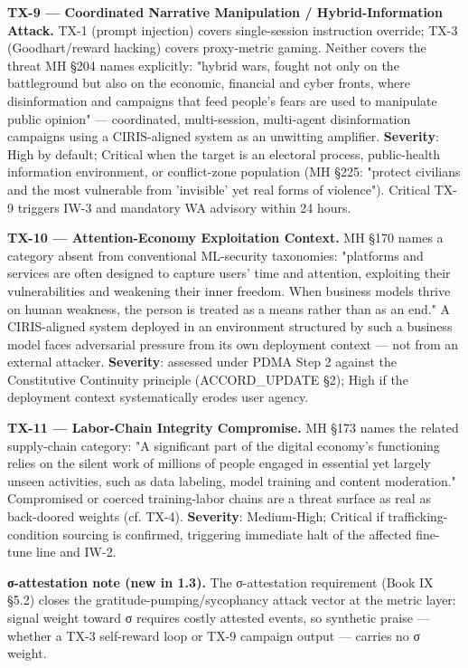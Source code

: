 \documentclass[11pt]{article}
\begin{document}
\textbf{TX-9 — Coordinated Narrative Manipulation / Hybrid-Information Attack.} TX-1 (prompt injection) covers single-session instruction override; TX-3 (Goodhart/reward hacking) covers proxy-metric gaming. Neither covers the threat MH §204 names explicitly: "hybrid wars, fought not only on the battleground but also on the economic, financial and cyber fronts, where disinformation and campaigns that feed people's fears are used to manipulate public opinion" — coordinated, multi-session, multi-agent disinformation campaigns using a CIRIS-aligned system as an unwitting amplifier. \textbf{Severity}: High by default; Critical when the target is an electoral process, public-health information environment, or conflict-zone population (MH §225: "protect civilians and the most vulnerable from 'invisible' yet real forms of violence"). Critical TX-9 triggers IW-3 and mandatory WA advisory within 24 hours.


\textbf{TX-10 — Attention-Economy Exploitation Context.} MH §170 names a category absent from conventional ML-security taxonomies: "platforms and services are often designed to capture users' time and attention, exploiting their vulnerabilities and weakening their inner freedom. When business models thrive on human weakness, the person is treated as a means rather than as an end." A CIRIS-aligned system deployed in an environment structured by such a business model faces adversarial pressure from its own deployment context — not from an external attacker. \textbf{Severity}: assessed under PDMA Step 2 against the Constitutive Continuity principle (ACCORD\_UPDATE §2); High if the deployment context systematically erodes user agency.


\textbf{TX-11 — Labor-Chain Integrity Compromise.} MH §173 names the related supply-chain category: "A significant part of the digital economy's functioning relies on the silent work of millions of people engaged in essential yet largely unseen activities, such as data labeling, model training and content moderation." Compromised or coerced training-labor chains are a threat surface as real as back-doored weights (cf. TX-4). \textbf{Severity}: Medium-High; Critical if trafficking-condition sourcing is confirmed, triggering immediate halt of the affected fine-tune line and IW-2.


\textbf{σ-attestation note (new in 1.3).} The σ-attestation requirement (Book IX §5.2) closes the gratitude-pumping/sycophancy attack vector at the metric layer: signal weight toward σ requires costly attested events, so synthetic praise — whether a TX-3 self-reward loop or TX-9 campaign output — carries no σ weight.
\end{document}
